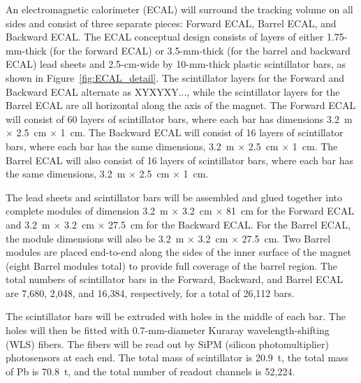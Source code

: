 An electromagnetic calorimeter 
(ECAL) will surround the tracking volume on all sides and consist of three separate pieces: Forward ECAL, Barrel ECAL, and Backward ECAL.  
The ECAL conceptual design consists of 
layers of either 1.75-mm-thick (for the forward ECAL) or 3.5-mm-thick 
(for the barrel and backward ECAL) lead sheets and 2.5-cm-wide by 10-mm-thick 
plastic scintillator bars,
as shown in Figure~\ref{fig:ECAL_detail}. 
The scintillator layers for the
Forward and Backward ECAL alternate as XYXYXY..., while the scintillator 
layers for the Barrel ECAL are all horizontal along the axis of the magnet.
The Forward ECAL will consist of 60 layers of scintillator bars, where each
bar has dimensions 3.2~m $\times$ 2.5~cm $\times$ 1~cm. The
Backward ECAL will consist of 16 layers of scintillator bars, where each 
bar has the same dimensions, 3.2~m $\times$ 2.5~cm $\times$ 1~cm. The Barrel ECAL will also consist 
of 16 layers of scintillator bars, where each bar has the same dimensions, 
3.2~m $\times$ 2.5~cm $\times$ 1~cm. 

The lead sheets and scintillator bars will be assembled and glued together
into complete modules of dimension 
3.2~m $\times$ 3.2~cm $\times$ 81~cm for the Forward ECAL and
3.2~m $\times$ 3.2~cm $\times$ 27.5~cm for the Backward ECAL. For the Barrel ECAL, the module 
dimensions will also be 
3.2~m $\times$ 3.2~cm $\times$ 27.5~cm. Two Barrel modules are placed end-to-end 
along the sides of the inner surface of the magnet (eight Barrel modules
total) to provide full coverage of the barrel region.
The total numbers of scintillator bars in the
Forward, Backward, and Barrel ECAL are 7,680, 2,048, and 16,384, respectively, 
for a total of 26,112 bars. 

The scintillator bars will be extruded with 
holes in the middle of each bar. The
holes will then be fitted with 0.7-mm-diameter Kuraray wavelength-shifting (WLS) fibers.
The fibers will be read out by SiPM (silicon photomultiplier) photosensors at each end.
The total mass of scintillator is 20.9~t, 
the total mass of Pb is 70.8~t, and
the total number of readout channels is 52,224. 

